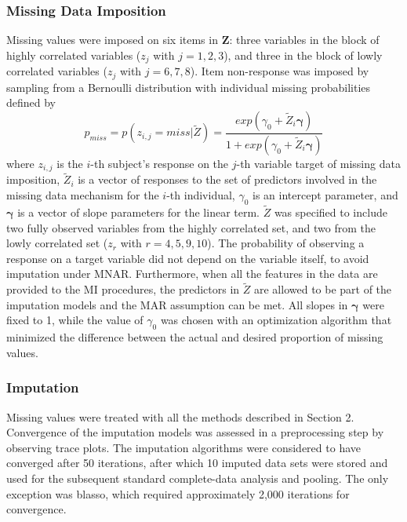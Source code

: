 \subsubsection{Missing Data Imposition} \label{sub_missing}

	Missing values were imposed on six items in $\bm{Z}$: three variables in the block of
	highly correlated variables ($z_j$ with $j = 1,2,3$), and three in the block of lowly correlated variables ($z_j$ 
	with $j = 6,7,8$).
	Item non-response was imposed by sampling from a Bernoulli distribution with individual missing probabilities 
	defined by 
%
	\begin{equation} \label{eqn:rm}
		p_{miss} = p(z_{i,j} = miss | \tilde{Z}) = \frac{ exp(\gamma_0 + \tilde{Z}_{i}\bm{\gamma}) }
								{ 1 + exp(\gamma_0 + \tilde{Z}_{i}\bm{\gamma}) }
	\end{equation}
%
	where $z_{i,j}$ is the $i$-th subject's response on the $j$-th variable target of missing data imposition, 
	$\tilde{Z}_{i}$ is a vector of responses to the set of predictors involved in the missing data mechanism 
	for the $i$-th individual, $\gamma_0$ is an intercept parameter, and $\bm{\gamma}$ is a vector of slope 
	parameters for the linear term.
	$\tilde{Z}$ was specified to include two fully observed variables from the highly correlated set, and two 
	from the lowly correlated set ($z_r$ with $r = 4,5,9,10$).
	The probability of observing a response on a target variable did not depend on the variable itself, 
	to avoid imputation under MNAR.
	Furthermore, when all the features in the data are provided to the MI procedures, the predictors in $\tilde{Z}$ 
	are allowed to be part of the imputation models and the MAR assumption can be met.
	All slopes in $\bm{\gamma}$ were fixed to 1, while the value of $\gamma_0$ was chosen with an optimization 
	algorithm that minimized the difference between the actual and desired proportion of missing values.

\subsubsection{Imputation}
	
	Missing values were treated with all the methods described in Section 2.
	Convergence of the imputation models was assessed in a preprocessing step by observing trace plots.
	The imputation algorithms were considered to have converged after 50 iterations, after which 10 imputed data 
	sets were stored and used for the subsequent standard complete-data analysis and pooling.
	The only exception was blasso, which required approximately 2,000 iterations for convergence.

